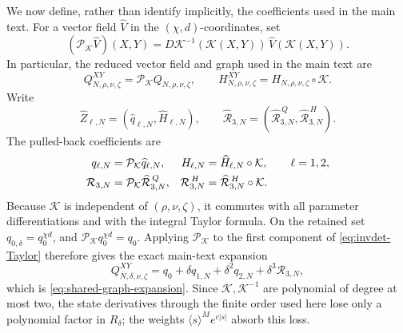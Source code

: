 We now define, rather than identify implicitly, the coefficients used in
the main text.  For a vector field \(\widehat V\) in the
\((\chi,d)\)-coordinates, set
\begin{equation}
 (\mathcal P_{\mathcal K}\widehat V)(X,Y)
 =D\mathcal K^{-1}(\mathcal K(X,Y))\,
        \widehat V(\mathcal K(X,Y)).                  \label{eq:invdet-vector-field-pullback}
\end{equation}
In particular, the reduced vector field and graph used in the main text are
\begin{equation}
 Q^{XY}_{N,\rho,\nu,\zeta}
 =\mathcal P_{\mathcal K}Q_{N,\rho,\nu,\zeta},
 \qquad
 H^{XY}_{N,\rho,\nu,\zeta}
 =H_{N,\rho,\nu,\zeta}\circ\mathcal K.                \label{eq:invdet-full-graph-pullback}
\end{equation}
Write
\[
 \widehat Z_{\ell,N}=(\widehat q_{\ell,N},\widehat H_{\ell,N}),
 \qquad
 \widehat{\mathcal R}_{3,N}
   =(\widehat{\mathcal R}^{\,Q}_{3,N},
      \widehat{\mathcal R}^{\,H}_{3,N}).
\]
The pulled-back coefficients are
\begin{align}
 q_{\ell,N}&=\mathcal P_{\mathcal K}\widehat q_{\ell,N},
 &H_{\ell,N}&=\widehat H_{\ell,N}\circ\mathcal K,
 \qquad \ell=1,2,\notag\\
 \mathcal R_{3,N}
 &=\mathcal P_{\mathcal K}\widehat{\mathcal R}^{\,Q}_{3,N},
 &\mathcal R^{\,H}_{3,N}
 &=\widehat{\mathcal R}^{\,H}_{3,N}\circ\mathcal K.   \label{eq:invdet-coefficient-pullbacks}
\end{align}
Because \(\mathcal K\) is independent of
\((\rho,\nu,\zeta)\), it commutes with all parameter differentiations and
with the integral Taylor formula.  On the retained set
\(q_{0,\delta}=q_0^{\chi d}\), and
\(\mathcal P_{\mathcal K}q_0^{\chi d}=q_0\).  Applying
\(\mathcal P_{\mathcal K}\) to the first component of
\cref{eq:invdet-Taylor} therefore gives the exact main-text expansion
\[
 Q^{XY}_{N,\delta,\nu,\zeta}
 =q_0+\delta q_{1,N}+\delta^2q_{2,N}
       +\delta^3\mathcal R_{3,N},
\]
which is \cref{eq:shared-graph-expansion}.  Since
\(\mathcal K,\mathcal K^{-1}\) are polynomial of degree at most two, the
state derivatives through the finite order used here lose only a
polynomial factor in \(R_\delta\); the weights
\(\langle s\rangle^Me^{c|s|}\) absorb this loss.

